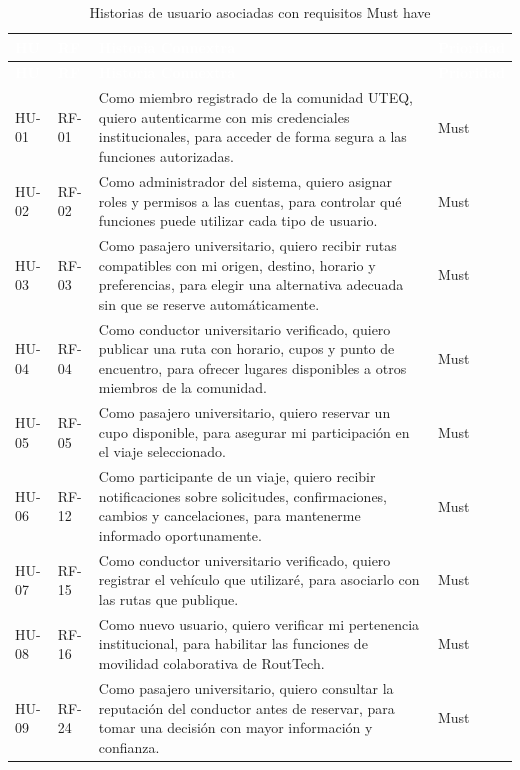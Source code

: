 \documentclass[12pt,a4paper]{article}
\begin{document}
\begin{longtable}{C{1.25cm} C{1.35cm} L{9.15cm} C{1.80cm}}
\caption{Historias de usuario asociadas con requisitos Must have}\label{tab:resumen-hu-must}\\
\textcolor{white}{\textbf{HU}} &
\textcolor{white}{\textbf{RF}} &
\textcolor{white}{\textbf{Historia Connextra}} &
\textcolor{white}{\textbf{Prioridad}}\\
\endfirsthead
{}
\textcolor{white}{\textbf{HU}} &
\textcolor{white}{\textbf{RF}} &
\textcolor{white}{\textbf{Historia Connextra}} &
\textcolor{white}{\textbf{Prioridad}}\\
\endhead
HU-01 & RF-01 & Como miembro registrado de la comunidad UTEQ, quiero autenticarme con mis credenciales institucionales, para acceder de forma segura a las funciones autorizadas. & Must\\
HU-02 & RF-02 & Como administrador del sistema, quiero asignar roles y permisos a las cuentas, para controlar qué funciones puede utilizar cada tipo de usuario. & Must\\
HU-03 & RF-03 & Como pasajero universitario, quiero recibir rutas compatibles con mi origen, destino, horario y preferencias, para elegir una alternativa adecuada sin que se reserve automáticamente. & Must\\
HU-04 & RF-04 & Como conductor universitario verificado, quiero publicar una ruta con horario, cupos y punto de encuentro, para ofrecer lugares disponibles a otros miembros de la comunidad. & Must\\
HU-05 & RF-05 & Como pasajero universitario, quiero reservar un cupo disponible, para asegurar mi participación en el viaje seleccionado. & Must\\
HU-06 & RF-12 & Como participante de un viaje, quiero recibir notificaciones sobre solicitudes, confirmaciones, cambios y cancelaciones, para mantenerme informado oportunamente. & Must\\
HU-07 & RF-15 & Como conductor universitario verificado, quiero registrar el vehículo que utilizaré, para asociarlo con las rutas que publique. & Must\\
HU-08 & RF-16 & Como nuevo usuario, quiero verificar mi pertenencia institucional, para habilitar las funciones de movilidad colaborativa de RoutTech. & Must\\
HU-09 & RF-24 & Como pasajero universitario, quiero consultar la reputación del conductor antes de reservar, para tomar una decisión con mayor información y confianza. & Must\\
\end{longtable}
\end{document}
